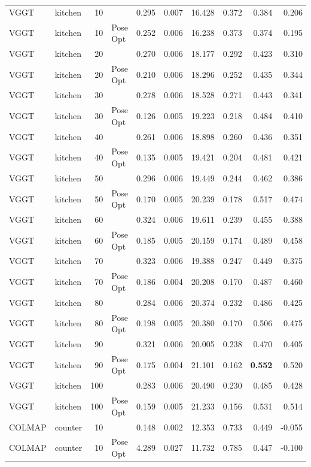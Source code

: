 \begin{table}[H]
\begin{tabular}{llrlrrrrrr}
VGGT & kitchen & 10 &  & 0.295 & 0.007 & 16.428 & 0.372 & 0.384 & 0.206 \\
VGGT & kitchen & 10 & Pose Opt & 0.252 & 0.006 & 16.238 & 0.373 & 0.374 & 0.195 \\
VGGT & kitchen & 20 &  & 0.270 & 0.006 & 18.177 & 0.292 & 0.423 & 0.310 \\
VGGT & kitchen & 20 & Pose Opt & 0.210 & 0.006 & 18.296 & 0.252 & 0.435 & 0.344 \\
VGGT & kitchen & 30 &  & 0.278 & 0.006 & 18.528 & 0.271 & 0.443 & 0.341 \\
VGGT & kitchen & 30 & Pose Opt & 0.126 & 0.005 & 19.223 & 0.218 & 0.484 & 0.410 \\
VGGT & kitchen & 40 &  & 0.261 & 0.006 & 18.898 & 0.260 & 0.436 & 0.351 \\
VGGT & kitchen & 40 & Pose Opt & 0.135 & 0.005 & 19.421 & 0.204 & 0.481 & 0.421 \\
VGGT & kitchen & 50 &  & 0.296 & 0.006 & 19.449 & 0.244 & 0.462 & 0.386 \\
VGGT & kitchen & 50 & Pose Opt & 0.170 & 0.005 & 20.239 & 0.178 & 0.517 & 0.474 \\
VGGT & kitchen & 60 &  & 0.324 & 0.006 & 19.611 & 0.239 & 0.455 & 0.388 \\
VGGT & kitchen & 60 & Pose Opt & 0.185 & 0.005 & 20.159 & 0.174 & 0.489 & 0.458 \\
VGGT & kitchen & 70 &  & 0.323 & 0.006 & 19.388 & 0.247 & 0.449 & 0.375 \\
VGGT & kitchen & 70 & Pose Opt & 0.186 & 0.004 & 20.208 & 0.170 & 0.487 & 0.460 \\
VGGT & kitchen & 80 &  & 0.284 & 0.006 & 20.374 & 0.232 & 0.486 & 0.425 \\
VGGT & kitchen & 80 & Pose Opt & 0.198 & 0.005 & 20.380 & 0.170 & 0.506 & 0.475 \\
VGGT & kitchen & 90 &  & 0.321 & 0.006 & 20.005 & 0.238 & 0.470 & 0.405 \\
VGGT & kitchen & 90 & Pose Opt & 0.175 & 0.004 & 21.101 & 0.162 & \textbf{0.552} & 0.520 \\
VGGT & kitchen & 100 &  & 0.283 & 0.006 & 20.490 & 0.230 & 0.485 & 0.428 \\
VGGT & kitchen & 100 & Pose Opt & 0.159 & 0.005 & 21.233 & 0.156 & 0.531 & 0.514 \\
\midrule
COLMAP & counter & 10 &  & 0.148 & 0.002 & 12.353 & 0.733 & 0.449 & -0.055 \\
COLMAP & counter & 10 & Pose Opt & 4.289 & 0.027 & 11.732 & 0.785 & 0.447 & -0.100 \\

\end{tabular}
\end{table}
